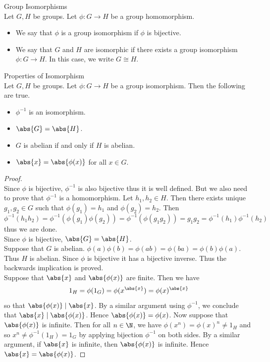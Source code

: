 \documentclass[a4paper]{article}
\begin{document}
\begin{defn}{Group Isomorphisms}{}\\
Let $G,H$ be groups. Let $\phi:G\to H$ be a group homomorphism. 
\begin{itemize}
\item We say that $\phi$ is a group isomorphism if $\phi$ is bijective. 
\item We say that $G$ and $H$ are isomorphic if there exists a group isomorphism $\phi:G\to H$. In this case, we write $G\cong H$. 
\end{itemize}
\end{defn}

\begin{prp}{Properties of Isomorphism}{}\\
Let $G,H$ be groups. Let $\phi:G\to H$ be a group isomorphism. Then the following are true. 
\begin{itemize}
\item $\phi^{-1}$ is an isomorphism. 
\item $\abs{G}=\abs{H}$. 
\item $G$ is abelian if and only if $H$ is abelian. 
\item $\abs{x}=\abs{\phi(x)}$ for all $x\in G$. 
\end{itemize}
\begin{proof}\\
Since $\phi$ is bijective, $\phi^{-1}$ is also bijective thus it is well defined. But we also need to prove that $\phi^{-1}$ is a homomorphism. Let $h_1,h_2\in H$. Then there exists unique $g_1,g_2\in G$ such that $\phi(g_1)=h_1$ and $\phi(g_2)=h_2$. Then $$\phi^{-1}(h_1h_2)=\phi^{-1}(\phi(g_1)\phi(g_2))=\phi^{-1}(\phi(g_1g_2))=g_1g_2=\phi^{-1}(h_1)\phi^{-1}(h_2)$$ thus we are done. \\

Since $\phi$ is bijective, $\abs{G}=\abs{H}$. \\

Suppose that $G$ is abelian. $\phi(a)\phi(b)=\phi(ab)=\phi(ba)=\phi(b)\phi(a)$. Thus $H$ is abelian. Since $\phi$ is bijective it has a bijective inverse. Thus the backwards implication is proved. \\

Suppose that $\abs{x}$ and $\abs{\phi(x)}$ are finite. Then we have $$1_H=\phi(1_G)=\phi(x^\abs{x})=\phi(x)^\abs{x}$$ so that $\abs{\phi(x)}\;|\;\abs{x}$. By a similar argument using $\phi^{-1}$, we conclude that $\abs{x}\;|\;\abs{\phi(x)}$. Hence $\abs{\phi(x)}=\phi(x)$. Now suppose that $\abs{\phi(x)}$ is infinite. Then for all $n\in\N$, we have $\phi(x^n)=\phi(x)^n\neq 1_H$ and so $x^n\neq\phi^{-1}(1_H)=1_G$ by applying bijection $\phi^{-1}$ on both sides. By a similar argument, if $\abs{x}$ is infinite, then $\abs{\phi(x)}$ is infinite. Hence $\abs{x}=\abs{\phi(x)}$. 
\end{proof}
\end{prp}
\end{document}

